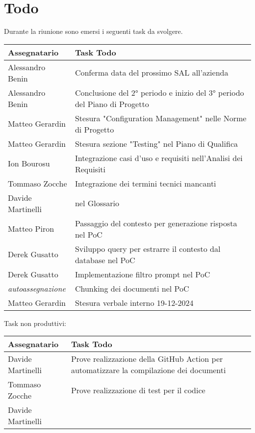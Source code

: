 \section{Todo}
Durante la riunione sono emersi i seguenti task da svolgere.

\begin{center}
  \begin{tabular}{|L{5cm}|L{8cm}|}
    \hline
    \textbf{Assegnatario} & \textbf{Task Todo} \\ \hline
    Alessandro Benin & Conferma data del prossimo SAL all'azienda \\ \hline
    Alessandro Benin & Conclusione del 2° periodo e inizio del 3° periodo del Piano di Progetto \\ \hline
    Matteo Gerardin & Stesura "Configuration Management" nelle Norme di Progetto \\ \hline
    Matteo Gerardin & Stesura sezione "Testing" nel Piano di Qualifica \\ \hline
    Ion Bourosu & Integrazione casi d'uso e requisiti nell'Analisi dei Requisiti \\ \hline
    Tommaso Zocche & Integrazione dei termini tecnici mancanti \\ 
    Davide Martinelli & nel Glossario \\ \hline
    Matteo Piron & Passaggio del contesto per generazione risposta nel PoC \\ \hline
    Derek Gusatto & Sviluppo query per estrarre il contesto dal database nel PoC \\ \hline
    Derek Gusatto & Implementazione filtro prompt nel PoC\\ \hline
    \textit{autoassegnazione} & Chunking dei documenti nel PoC \\ \hline
    Matteo Gerardin & Stesura verbale interno 19-12-2024 \\ \hline
  \end{tabular}
\end{center}

Task non produttivi:

\begin{center}
  \begin{tabular}{|L{5cm}|L{8cm}|}
    \hline
    \textbf{Assegnatario} & \textbf{Task Todo} \\ \hline
    Davide Martinelli & Prove realizzazione della GitHub Action per automatizzare la compilazione dei documenti \\ \hline
    Tommaso Zocche & Prove realizzazione di test per il codice \\
    Davide Martinelli & \\ \hline
  \end{tabular}
\end{center}